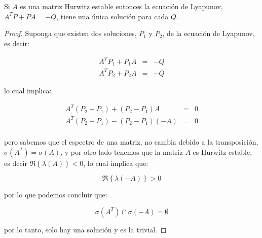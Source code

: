     \begin{corolario}
        Si $A$ es una matriz Hurwitz estable entonces la ecuación de Lyapunov, $A^T P + P A = -Q$, tiene una única solución para cada $Q$.
    \end{corolario}

    \begin{proof}
        Suponga que existen dos soluciones, $P_1$ y $P_2$, de la ecuación de Lyapunov, es decir:

        \begin{eqnarray*}
            A^T P_1 + P_1 A & = & -Q \\
            A^T P_2 + P_2 A & = & -Q
        \end{eqnarray*}

        lo cual implica:

        \begin{eqnarray*}
            A^T (P_2 - P_1) + (P_2 - P_1) A & = & 0 \\
            A^T (P_2 - P_1) - (P_2 - P_1) (-A) & = & 0 \\
        \end{eqnarray*}

        pero sabemos que el espectro de una matriz, no cambia debido a la transposición, $\sigma(A^T) = \sigma(A)$, y por otro lado tenemos que la matriz $A$ es Hurwitz estable, es decir $\Re{\left\{ \lambda(A)\right\}} < 0$, lo cual implica que:

        \begin{equation*}
            \Re{\left\{ \lambda(-A) \right\}} > 0
        \end{equation*}

        por lo que podemos concluir que:

        \begin{equation*}
            \sigma(A^T) \cap \sigma(-A) = \emptyset
        \end{equation*}

        por lo tanto, solo hay una solución y es la trivial.
    \end{proof}
